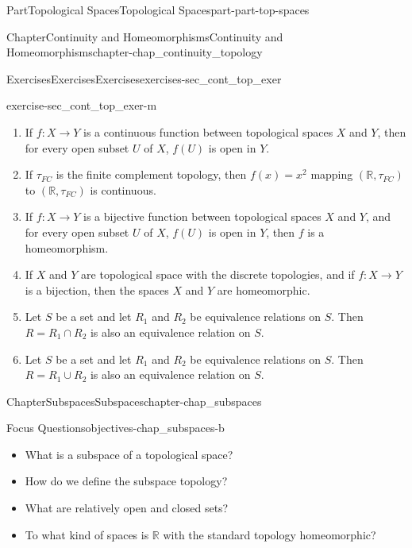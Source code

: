 \documentclass[oneside,10pt,]{book}
\numberwithin{equation}{chapter}
\newcommand{\R}{\mathbb{R}}
\begin{document}
\begin{partptx}{Part}{Topological Spaces}{}{Topological Spaces}{}{}{part-part-top-spaces}
\begin{chapterptx}{Chapter}{Continuity and Homeomorphisms}{}{Continuity and Homeomorphisms}{}{}{chapter-chap_continuity_topology}
\begin{exercises-section}{Exercises}{Exercises}{}{Exercises}{}{}{exercises-sec_cont_top_exer}
\begin{divisionexercise}{13}{}{}{exercise-sec_cont_top_exer-m}
\begin{enumerate}[font=\bfseries,label=(\alph*),ref=\alph*]%
\item{}If \(f : X \to Y\) is a continuous function between topological spaces \(X\) and \(Y\), then for every open subset \(U\) of \(X\), \(f(U)\) is open in \(Y\).%
\item{}If \(\tau_{FC}\) is the finite complement topology, then \(f(x) = x^2\) mapping \((\R, \tau_{FC})\) to \((\R, \tau_{FC})\) is continuous.%
\item{}If \(f : X \to Y\) is a bijective function between topological spaces \(X\) and \(Y\), and for every open subset \(U\) of \(X\), \(f(U)\) is open in \(Y\), then \(f\) is a homeomorphism.%
\item{}If \(X\) and \(Y\) are topological space with the discrete topologies, and if \(f: X \to Y\) is a bijection, then the spaces \(X\) and \(Y\) are homeomorphic.%
\item{}Let \(S\) be a set and let \(R_1\) and \(R_2\) be equivalence relations on \(S\). Then \(R = R_1 \cap R_2\) is also an equivalence relation on \(S\).%
\item{}Let \(S\) be a set and let \(R_1\) and \(R_2\) be equivalence relations on \(S\). Then \(R = R_1 \cup R_2\) is also an equivalence relation on \(S\).%
\end{enumerate}%
\end{divisionexercise}%
\end{exercises-section}
\end{chapterptx}
%
\typeout{************************************************}
\typeout{************************************************}
%
\begin{chapterptx}{Chapter}{Subspaces}{}{Subspaces}{}{}{chapter-chap_subspaces}
\renewcommand*{\chaptername}{Chapter}
\begin{objectives}{Focus Questions}{objectives-chap_subspaces-b}
%
\begin{itemize}[label=\textbullet]
\item{}What is a subspace of a topological space?%
\item{}How do we define the subspace topology?%
\item{}What are relatively open and closed sets?%
\item{}To what kind of spaces is \(\R\) with the standard topology homeomorphic?%
\end{itemize}
\end{objectives}
%
%
\typeout{************************************************}

\end{chapterptx}
\end{partptx}
\end{document}

